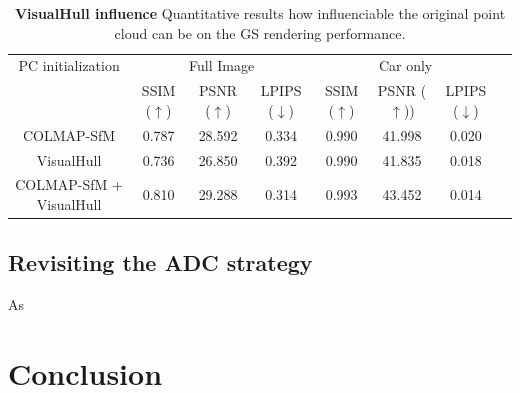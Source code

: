 \begin{table}[htp!]
  \caption{\textbf{VisualHull influence} Quantitative results how influenciable the original point cloud can be on the GS rendering performance.}
  \label{table:gs-vh-influence}
  \centering%
  \begin{adjustbox}{width=\linewidth}
  \begin{tabular}[h]{c||ccccccc}
  \hline
   PC initialization & \multicolumn{3}{c}{Full Image} & \multicolumn{3}{c}{Car only} \\
   &  SSIM ($\uparrow$) & PSNR ($\uparrow$) & LPIPS ($\downarrow$) & SSIM ($\uparrow$) & PSNR ($\uparrow$)) & LPIPS ($\downarrow$)\\
  \hline
  COLMAP-SfM  & 0.787  & 28.592 & 0.334 & 0.990 & 41.998 & 0.020 \\
  VisualHull & 0.736 & 26.850 & 0.392 & 0.990 & 41.835  & 0.018 \\
  COLMAP-SfM + VisualHull & \cellcolor{red!25}0.810 & \cellcolor{red!25}29.288 & \cellcolor{red!25}0.314 & \cellcolor{red!25}0.993 & \cellcolor{red!25}43.452  & \cellcolor{red!25}0.014 \\
  \hline 
  \end{tabular}
  \end{adjustbox}
  \end{table}

\subsection{Revisiting the ADC strategy}

As \citep{zhang2024pixel}

\section{Conclusion}
